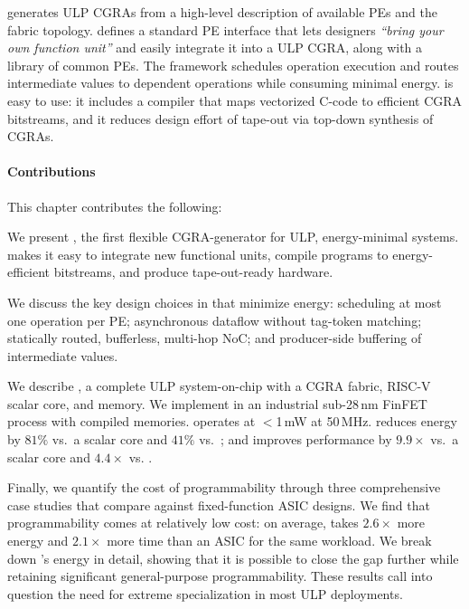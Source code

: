 \snafuframe generates ULP CGRAs from a high-level description of available PEs and the fabric topology.
%
\snafuframe defines a standard PE interface that lets designers \emph{``bring your own function unit''}
and easily integrate it into a ULP CGRA,
along with a library of common PEs.
%
The \snafuframe framework schedules operation execution and routes intermediate values to dependent operations
while consuming minimal energy.
%
\snafuframe is easy to use:
it includes a compiler that maps vectorized C-code to efficient CGRA bitstreams,
and it reduces design effort of tape-out via top-down synthesis of CGRAs.

\figSNAFUIntro

\paragraph{Contributions} This chapter contributes the following:
\begin{compactitem}
\item We present \snafuframe, the first flexible CGRA-generator for ULP, energy-minimal systems.
  \snafuframe makes it easy to integrate new functional units,
  compile programs to energy-efficient bitstreams,
  and produce tape-out-ready hardware.
  
\item We discuss the key design choices in \snafuframe that minimize energy:
  scheduling at most one operation per PE;
  asynchronous dataflow without tag-token matching;
  statically routed, bufferless, multi-hop NoC;
  and producer-side buffering of intermediate values.
  
\item We describe \snafuarch, a complete ULP system-on-chip with a CGRA fabric,
  RISC-V scalar core, and memory.
  We implement \snafuarch in an industrial sub-28\,nm FinFET process with compiled memories.
  \snafuarch operates at $<$1\,mW at 50\,MHz.
  \snafuarch reduces energy by $81\%$ vs.\ a scalar core
  and $41\%$ vs.\ \manic;
  and improves performance by $9.9\times$ vs.\ a scalar core
  and $4.4\times$ vs. \manic.

\item Finally, we quantify the cost of programmability through three
  comprehensive case studies that compare \snafuarch against
  fixed-function ASIC designs. We find that programmability comes at
  relatively low cost: on average, \snafuarch takes $2.6\times$ more
  energy and $2.1\times$ more time than an ASIC for the same
  workload. We break down \snafuarch's energy in detail, showing that it
  is possible to close the gap further while retaining significant
  general-purpose programmability. These results call into
  question the need for extreme specialization in most ULP
  deployments.
  
\end{compactitem}